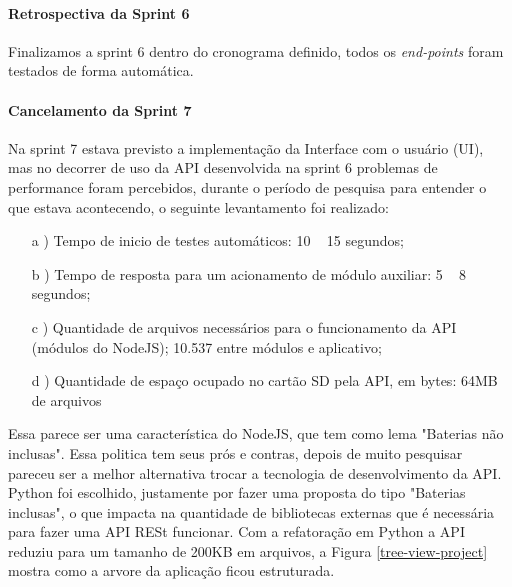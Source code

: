 \paragraph{Retrospectiva da Sprint 6}
Finalizamos a sprint 6 dentro do cronograma definido, todos os \textit{end-points} foram testados de forma automática.

\paragraph{Cancelamento da Sprint 7}
Na sprint 7 estava previsto a implementação da Interface com o usuário (UI), mas no decorrer de uso da API desenvolvida na sprint 6 problemas de performance foram percebidos, durante o período de pesquisa para entender o que estava acontecendo, o seguinte levantamento foi realizado:

\begin{itemize}
    \item[a]) Tempo de inicio de testes automáticos: 10 ~ 15 segundos;
    \item[b]) Tempo de resposta para um acionamento de módulo auxiliar: 5 ~ 8 segundos;
    \item[c]) Quantidade de arquivos necessários para o funcionamento da API (módulos do NodeJS); 10.537 entre módulos e aplicativo;
    \item[d]) Quantidade de espaço ocupado no cartão SD pela API, em bytes: 64MB de arquivos
\end{itemize}

Essa parece ser uma característica do NodeJS, que tem como lema "Baterias não inclusas". Essa politica tem seus prós e contras, depois de muito pesquisar pareceu ser a melhor alternativa trocar a tecnologia de desenvolvimento da API. Python foi escolhido, justamente por fazer uma proposta do tipo "Baterias inclusas", o que impacta na quantidade de bibliotecas externas que é necessária para fazer uma API RESt funcionar. Com a refatoração em Python a API reduziu para um tamanho de 200KB em arquivos, a Figura \ref{tree-view-project} mostra como a arvore da aplicação ficou estruturada.

